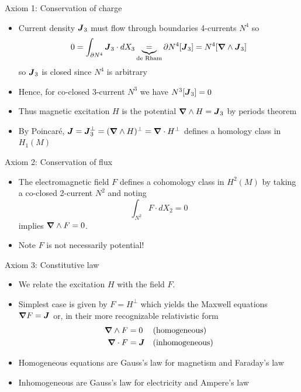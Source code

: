 \documentclass[aspectratio=169]{beamer}
\begin{document}
\begin{frame}{Axiom 1: Conservation of charge}
\vfill   
    \begin{itemize}
    \item Current density $\boldsymbol{J}_3$ must flow through boundaries 4-currents $N^4$ so
    \[
    0=\int_{\partial N^4} \boldsymbol{J}_3 \cdot dX_3 \underbrace{=}_{\textrm{de Rham}} {\partial N^4}[ \boldsymbol{J}_3]={N^4}[\boldsymbol{\nabla} \wedge \boldsymbol{J}_3]
    \]
    so $\boldsymbol{J}_3$ is closed since $N^4$ is arbitrary
    \item Hence, for co-closed 3-current $N^3$ we have ${N^3}[\boldsymbol{J}_3]=0$
    \item Thus magnetic excitation $H$ is the potential $\boldsymbol{\nabla} \wedge H=\boldsymbol{J}_3$ by periods theorem
    \item By Poincar\'e, $\boldsymbol{J}=\boldsymbol{J}_3^\perp = (\boldsymbol{\nabla} \wedge H)^\perp = \boldsymbol{\nabla} \cdot H^\perp$ defines a homology class in $H_1(M)$
\end{itemize}
\vfill
\end{frame}

\begin{frame}{Axiom 2: Conservation of flux}
\vfill
\begin{itemize}
	\item The electromagnetic field $F$ defines a cohomology class in $H^2(M)$ by taking a co-closed 2-current $N^2$ and noting
	    \[
	    \int_{N^2} F \cdot dX_2 = 0 
	    \]
	    implies $\boldsymbol{\nabla} \wedge F=0$.
	    \item Note $F$ is not necessarily potential!
\end{itemize}
\vfill
\end{frame}

\begin{frame}{Axiom 3: Constitutive law}
\vfill
    \begin{itemize}
    \item  We relate the excitation $H$ with the field $F$. 
    \item Simplest case is given by $F=H^\perp$ which yields the Maxwell equations $\boldsymbol{\nabla} F = \boldsymbol{J}$ or, in their more recognizable relativistic form
    \begin{align*}
        \boldsymbol{\nabla} \wedge F &= 0 && \textrm{(homogeneous)}\\
        \boldsymbol{\nabla} \cdot F &= \boldsymbol{J} && \textrm{(inhomogeneous)}
    \end{align*}
    \item Homogeneous equations are Gauss's law for magnetism and Faraday's law
    \item Inhomogeneous are Gauss's law for electricity and Ampere's law
\end{itemize}
\vfill
\end{frame}
\end{document}
